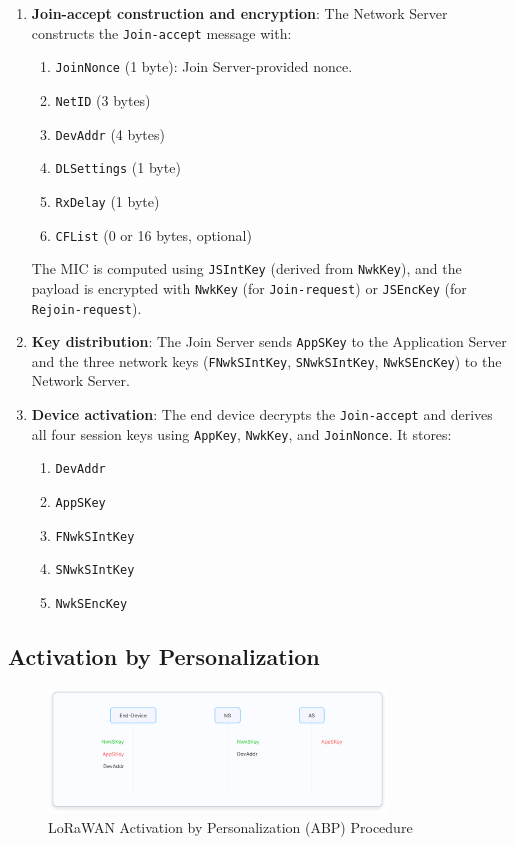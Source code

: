 \begin{enumerate}
    \item \textbf{Join-accept construction and encryption}: The Network Server constructs the \texttt{Join-accept} message with:
          \begin{enumerate}
              \item \texttt{JoinNonce} (1 byte): Join Server-provided nonce.
              \item \texttt{NetID} (3 bytes)
              \item \texttt{DevAddr} (4 bytes)
              \item \texttt{DLSettings} (1 byte)
              \item \texttt{RxDelay} (1 byte)
              \item \texttt{CFList} (0 or 16 bytes, optional)
          \end{enumerate}
          The MIC is computed using \texttt{JSIntKey} (derived from \texttt{NwkKey}), and the payload is encrypted with \texttt{NwkKey} (for \texttt{Join-request}) or \texttt{JSEncKey} (for \texttt{Rejoin-request}).

    \item \textbf{Key distribution}: The Join Server sends \texttt{AppSKey} to the Application Server and the three network keys (\texttt{FNwkSIntKey}, \texttt{SNwkSIntKey}, \texttt{NwkSEncKey}) to the Network Server.

    \item \textbf{Device activation}: The end device decrypts the \texttt{Join-accept} and derives all four session keys using \texttt{AppKey}, \texttt{NwkKey}, and \texttt{JoinNonce}. It stores:
          \begin{enumerate}
              \item \texttt{DevAddr}
              \item \texttt{AppSKey}
              \item \texttt{FNwkSIntKey}
              \item \texttt{SNwkSIntKey}
              \item \texttt{NwkSEncKey}
          \end{enumerate}
\end{enumerate}

\subsection{Activation by Personalization}
\begin{figure}
    \centering
    \includegraphics[width=0.8\textwidth]{figures/abp-1.0.png}
    \caption{LoRaWAN Activation by Personalization (ABP) Procedure}
    \label{fig:lora_abp}
\end{figure}

